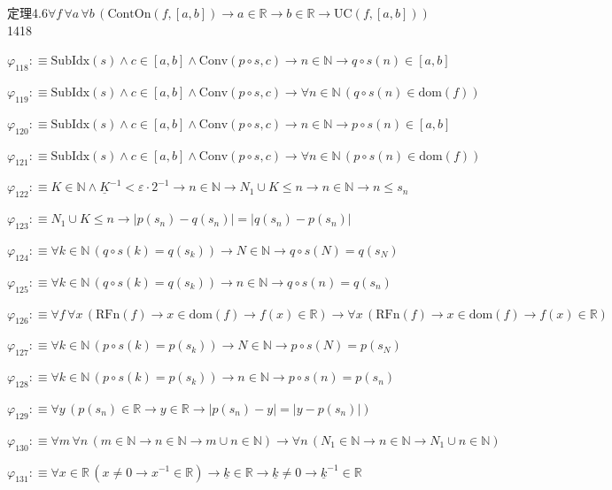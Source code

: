 \begin{fullproof}{定理4.6}{$\forall f\,\forall a\,\forall b\,(\mathrm{ContOn}(f,[a,b]) \to a \in \mathbb{R} \to b \in \mathbb{R} \to \mathrm{UC}(f,[a,b]))$}{1418}
\begin{abbrevlist}
\item $\varphi_{118} :\equiv \mathrm{SubIdx}(s) \land c \in [a,b] \land \mathrm{Conv}(p \circ s,c) \to n \in \mathbb{N} \to q \circ s(n) \in [a,b]$
\item $\varphi_{119} :\equiv \mathrm{SubIdx}(s) \land c \in [a,b] \land \mathrm{Conv}(p \circ s,c) \to \forall n \in \mathbb{N}\,(q \circ s(n) \in \mathrm{dom}(f))$
\item $\varphi_{120} :\equiv \mathrm{SubIdx}(s) \land c \in [a,b] \land \mathrm{Conv}(p \circ s,c) \to n \in \mathbb{N} \to p \circ s(n) \in [a,b]$
\item $\varphi_{121} :\equiv \mathrm{SubIdx}(s) \land c \in [a,b] \land \mathrm{Conv}(p \circ s,c) \to \forall n \in \mathbb{N}\,(p \circ s(n) \in \mathrm{dom}(f))$
\item $\varphi_{122} :\equiv K \in \mathbb{N} \land \underline{K}^{-1} < \varepsilon \cdot 2^{-1} \to n \in \mathbb{N} \to N_{1} \cup K \leq n \to n \in \mathbb{N} \to n \leq s_{n}$
\item $\varphi_{123} :\equiv N_{1} \cup K \leq n \to \lvert p(s_{n}) - q(s_{n}) \rvert = \lvert q(s_{n}) - p(s_{n}) \rvert$
\item $\varphi_{124} :\equiv \forall k \in \mathbb{N}\,(q \circ s(k) = q(s_{k})) \to N \in \mathbb{N} \to q \circ s(N) = q(s_{N})$
\item $\varphi_{125} :\equiv \forall k \in \mathbb{N}\,(q \circ s(k) = q(s_{k})) \to n \in \mathbb{N} \to q \circ s(n) = q(s_{n})$
\item $\varphi_{126} :\equiv \forall f\,\forall x\,(\mathrm{RFn}(f) \to x \in \mathrm{dom}(f) \to f(x) \in \mathbb{R}) \to \forall x\,(\mathrm{RFn}(f) \to x \in \mathrm{dom}(f) \to f(x) \in \mathbb{R})$
\item $\varphi_{127} :\equiv \forall k \in \mathbb{N}\,(p \circ s(k) = p(s_{k})) \to N \in \mathbb{N} \to p \circ s(N) = p(s_{N})$
\item $\varphi_{128} :\equiv \forall k \in \mathbb{N}\,(p \circ s(k) = p(s_{k})) \to n \in \mathbb{N} \to p \circ s(n) = p(s_{n})$
\item $\varphi_{129} :\equiv \forall y\,(p(s_{n}) \in \mathbb{R} \to y \in \mathbb{R} \to \lvert p(s_{n}) - y \rvert = \lvert y - p(s_{n}) \rvert)$
\item $\varphi_{130} :\equiv \forall m\,\forall n\,(m \in \mathbb{N} \to n \in \mathbb{N} \to m \cup n \in \mathbb{N}) \to \forall n\,(N_{1} \in \mathbb{N} \to n \in \mathbb{N} \to N_{1} \cup n \in \mathbb{N})$
\item $\varphi_{131} :\equiv \forall x \in \mathbb{R}\,(x \neq 0 \to x^{-1} \in \mathbb{R}) \to \underline{k} \in \mathbb{R} \to \underline{k} \neq 0 \to \underline{k}^{-1} \in \mathbb{R}$

\end{abbrevlist}
\end{fullproof}
